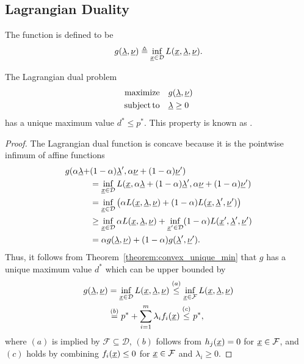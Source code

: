 \subsection{Lagrangian Duality}


\begin{definition}
The  function is defined to be
\[ g(\underline{\lambda},\underline{\nu}) \triangleq \inf_{\underline{x}\in \mathcal{D}} L(\underline{x},\underline{\lambda},\underline{\nu}). \]
\end{definition}


\begin{lemma}
The Lagrangian dual problem
\begin{align*}
\mathrm{maximize} \quad & g(\underline{\lambda},\underline{\nu}) \\
\mathrm{subject\,to} \quad & \underline{\lambda} \geq 0
\end{align*}
has a unique maximum value $d^* \leq p^*$.
This property is known as .
\end{lemma}

\begin{proof}
The Lagrangian dual function is concave because it is the pointwise infimum of affine functions
\begin{align*}
g(\alpha\underline{\lambda}+&(1-\alpha)\underline{\lambda}',\alpha\underline{\nu}+(1-\alpha)\underline{\nu}') \\
&= \inf_{\underline{x}\in \mathcal{D}} L(\underline{x},\alpha\underline{\lambda}+(1-\alpha)\underline{\lambda}',\alpha\underline{\nu}+(1-\alpha) \underline{\nu}') \\
&= \inf_{\underline{x}\in \mathcal{D}} \big( \alpha L(\underline{x},\underline{\lambda},\underline{\nu}) + (1-\alpha) L(\underline{x},\underline{\lambda}',\underline{\nu}') \big) \\
&\geq \inf_{\underline{x}\in \mathcal{D}} \alpha L(\underline{x},\underline{\lambda},\underline{\nu}) + \inf_{\underline{x}'\in \mathcal{D}} (1-\alpha) L(\underline{x}',\underline{\lambda}',\underline{\nu}') \\
&= \alpha g(\underline{\lambda},\underline{\nu}) + (1-\alpha) g(\underline{\lambda}',\underline{\nu}').
\end{align*}
Thus, it follows from Theorem~\ref{theorem:convex_unique_min} that $g$ has a unique maximum value $d^*$ which can be upper bounded by
\begin{align*}
g(\underline{\lambda},\underline{\nu})
&= \inf_{\underline{x}\in \mathcal{D}} L(\underline{x},\underline{\lambda},\underline{\nu})
\stackrel{(a)}{\leq} \inf_{\underline{x}\in \mathcal{F}} L(\underline{x},\underline{\lambda},\underline{\nu}) \\
&\stackrel{(b)}{=} p^* + \sum_{i=1}^m \lambda_i f_i (\underline{x})
\stackrel{(c)}{\leq} p^*,
\end{align*}
where $(a)$ is implied by $\mathcal{F} \subseteq \mathcal{D}$, $(b)$ follows from $h_j(\underline{x}) = 0$ for $\underline{x}\in \mathcal{F}$, and $(c)$ holds by combining $f_i(\underline{x}) \leq 0$ for $\underline{x}\in \mathcal{F}$ and $\lambda_i \geq 0$.
\end{proof}

